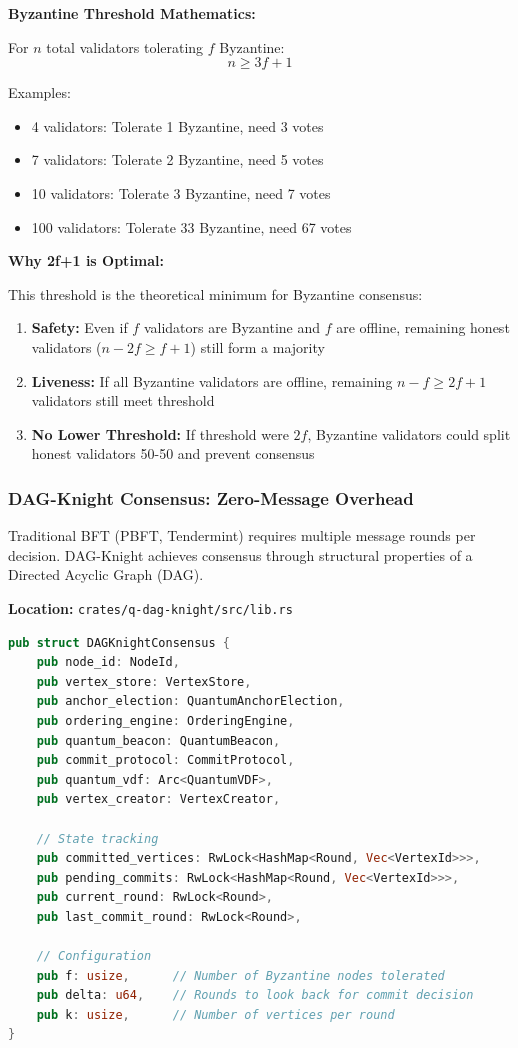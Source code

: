 \documentclass[11pt,a4paper]{article}
\begin{document}
\textbf{Byzantine Threshold Mathematics:}

For $n$ total validators tolerating $f$ Byzantine:
\[n \geq 3f + 1\]

Examples:
\begin{itemize}[leftmargin=*]
\item 4 validators: Tolerate 1 Byzantine, need 3 votes
\item 7 validators: Tolerate 2 Byzantine, need 5 votes
\item 10 validators: Tolerate 3 Byzantine, need 7 votes
\item 100 validators: Tolerate 33 Byzantine, need 67 votes
\end{itemize}

\textbf{Why 2f+1 is Optimal:}

This threshold is the theoretical minimum for Byzantine consensus:
\begin{enumerate}[leftmargin=*]
\item \textbf{Safety:} Even if $f$ validators are Byzantine and $f$ are offline, remaining honest validators ($n-2f \geq f+1$) still form a majority
\item \textbf{Liveness:} If all Byzantine validators are offline, remaining $n-f \geq 2f+1$ validators still meet threshold
\item \textbf{No Lower Threshold:} If threshold were $2f$, Byzantine validators could split honest validators 50-50 and prevent consensus
\end{enumerate}

\subsubsection{DAG-Knight Consensus: Zero-Message Overhead}

Traditional BFT (PBFT, Tendermint) requires multiple message rounds per decision. DAG-Knight achieves consensus through structural properties of a Directed Acyclic Graph (DAG).

\textbf{Location:} \texttt{crates/q-dag-knight/src/lib.rs}

\begin{lstlisting}[language=Rust,caption={DAG-Knight Core Architecture}]
pub struct DAGKnightConsensus {
    pub node_id: NodeId,
    pub vertex_store: VertexStore,
    pub anchor_election: QuantumAnchorElection,
    pub ordering_engine: OrderingEngine,
    pub quantum_beacon: QuantumBeacon,
    pub commit_protocol: CommitProtocol,
    pub quantum_vdf: Arc<QuantumVDF>,
    pub vertex_creator: VertexCreator,

    // State tracking
    pub committed_vertices: RwLock<HashMap<Round, Vec<VertexId>>>,
    pub pending_commits: RwLock<HashMap<Round, Vec<VertexId>>>,
    pub current_round: RwLock<Round>,
    pub last_commit_round: RwLock<Round>,

    // Configuration
    pub f: usize,      // Number of Byzantine nodes tolerated
    pub delta: u64,    // Rounds to look back for commit decision
    pub k: usize,      // Number of vertices per round
}
\end{lstlisting}
\end{document}
